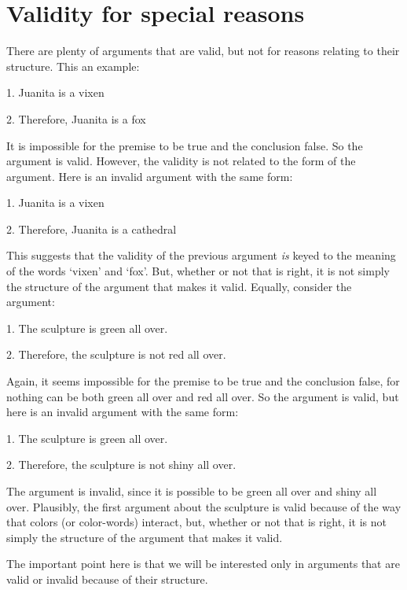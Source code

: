 \section{Validity for special reasons}
There are plenty of arguments that are valid, but not for reasons relating to their structure. This an example:
	\begin{earg}
		\item[1.] Juanita is a vixen
		\item[2.] Therefore, Juanita is a fox
	\end{earg}
It is impossible for the premise to be true and the conclusion false. So the argument is valid. However, the validity is not related to the form of the argument. Here is an invalid argument with the same form:
	\begin{earg}
		\item[1.] Juanita is a vixen
		\item[2.] Therefore, Juanita is a cathedral
	\end{earg}
This suggests that the validity of the previous argument \emph{is} keyed to the meaning of the words `vixen' and `fox'. But, whether or not that is right, it is not simply the structure of the argument that makes it valid. Equally, consider the argument:
	\begin{earg}
		\item[1.] The sculpture is green all over.
		\item[2.] Therefore, the sculpture is not red all over. 
	\end{earg}
Again, it seems impossible for the premise to be true and the conclusion false, for nothing can be both green all over and red all over. So the argument is valid, but here is an invalid argument with the same form:
	\begin{earg}
		\item[1.] The sculpture is green all over.
		\item[2.] Therefore, the sculpture is not shiny all over.
	\end{earg}
The argument is invalid, since it is possible to be green all over and shiny all over. Plausibly, the first argument about the sculpture is valid because of the way that colors (or color-words) interact, but, whether or not that is right, it is not simply the structure of the argument that makes it valid. 

The important point here is that we will be interested only in arguments that are valid or invalid because of their structure.


